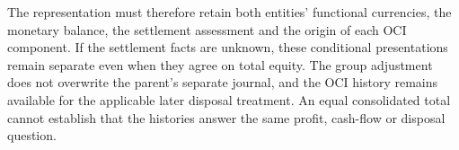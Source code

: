 The representation must therefore retain both entities' functional currencies,
the monetary balance, the settlement assessment and the origin of each OCI
component. If the settlement facts are unknown, these conditional presentations
remain separate even when they agree on total equity. The group adjustment
does not overwrite the parent's separate journal, and the OCI history remains
available for the applicable later disposal treatment. An equal consolidated
total cannot establish that the histories answer the same profit, cash-flow
or disposal question.
